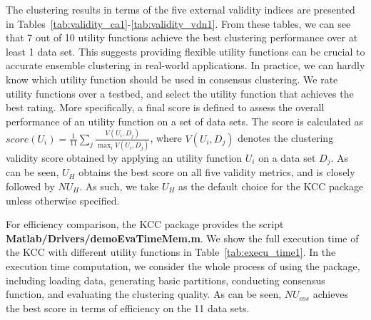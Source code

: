 \documentclass[10pt]{acmtrans2e}
\newcommand{\package}[1]{\textsf{#1}\xspace} %
\begin{document}
The clustering results in terms of the five external validity indices are presented in Tables~\ref{tab:validity_ca1}-\ref{tab:validity_vdn1}. From these tables, we can see that 7 out of 10 utility functions achieve the best clustering performance over at least 1 data set. This suggests providing flexible utility functions can be crucial to accurate ensemble clustering in real-world applications. In practice, we can hardly know which utility function should be used in consensus clustering. We rate utility functions over a testbed, and select the utility function that achieves the best rating. More specifically, a final score is defined to assess the overall performance of an utility function on a set of data sets. The score is calculated as $score(U_i)=\frac{1}{11}\sum_j \frac{V(U_i,D_j)}{\max_i V(U_i, D_j)}$, where $V(U_i,D_j)$ denotes the clustering validity score obtained by applying an utility function $U_i$ on a data set $D_j$. As can be seen, $U_H$ obtains the best score on all five validity metrics, and is closely followed by $NU_{H}$. As such, we take $U_H$ as the default choice for the \package{KCC} package unless otherwise specified.

For efficiency comparison, the \package{KCC} package provides the script \textbf{Matlab/Drivers/demoEvaTimeMem.m}. We show the full execution time of the \package{KCC} with different utility functions in Table~\ref{tab:execu_time1}. In the execution time computation, we consider the whole process of using the package, including loading data, generating basic partitions, conducting consensus function, and evaluating the clustering quality. As can be seen, $NU_{cos}$ achieves the best score in terms of efficiency on the 11 data sets.
\end{document}
